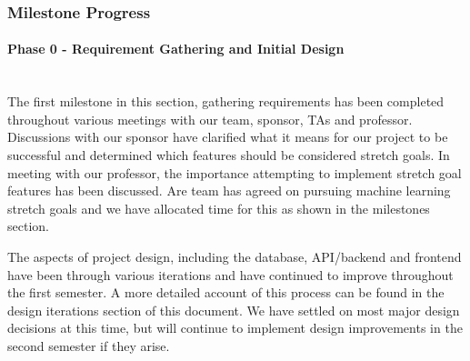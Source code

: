 \subsubsection{Milestone Progress}
\paragraph{Phase 0 - Requirement Gathering and Initial Design} \mbox{}\\[\paragraphheaderspace]
The first milestone in this section, gathering requirements has been completed throughout various meetings with our team, sponsor, TAs and professor. Discussions with our sponsor have clarified what it means for our project to be successful and determined which features should be considered stretch goals. In meeting with our professor, the importance attempting to implement stretch goal features has been discussed. Are team has agreed on pursuing machine learning stretch goals and we have allocated time for this as shown in the milestones section.\par
The aspects of project design, including the database, API/backend and frontend have been through various iterations and have continued to improve throughout the first semester. A more detailed account of this process can be found in the design iterations section of this document. We have settled on most major design decisions at this time, but will continue to implement design improvements in the second semester if they arise.\par
